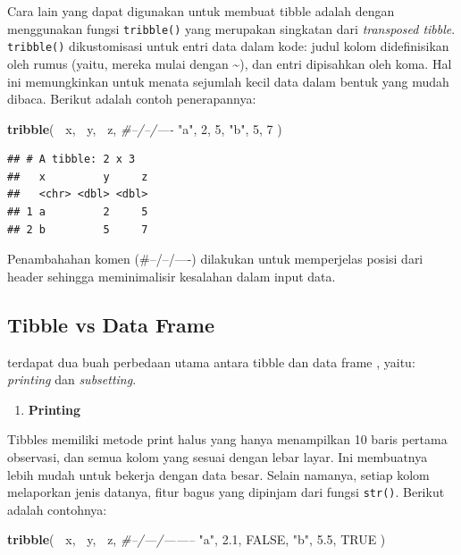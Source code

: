 \documentclass[]{book}
\newenvironment{Shaded}{\begin{snugshade}}{\end{snugshade}}
\newcommand{\KeywordTok}[1]{\textcolor[rgb]{0.13,0.29,0.53}{\textbf{#1}}}
\newcommand{\DecValTok}[1]{\textcolor[rgb]{0.00,0.00,0.81}{#1}}
\newcommand{\FloatTok}[1]{\textcolor[rgb]{0.00,0.00,0.81}{#1}}
\newcommand{\StringTok}[1]{\textcolor[rgb]{0.31,0.60,0.02}{#1}}
\newcommand{\CommentTok}[1]{\textcolor[rgb]{0.56,0.35,0.01}{\textit{#1}}}
\newcommand{\OtherTok}[1]{\textcolor[rgb]{0.56,0.35,0.01}{#1}}
\newcommand{\OperatorTok}[1]{\textcolor[rgb]{0.81,0.36,0.00}{\textbf{#1}}}
\newcommand{\NormalTok}[1]{#1}
\providecommand{\tightlist}{%
  \setlength{\itemsep}{0pt}\setlength{\parskip}{0pt}}
\begin{document}
Cara lain yang dapat digunakan untuk membuat tibble adalah dengan
menggunakan fungsi \texttt{tribble()} yang merupakan singkatan dari
\emph{transposed tibble}. \texttt{tribble()} dikustomisasi untuk entri
data dalam kode: judul kolom didefinisikan oleh rumus (yaitu, mereka
mulai dengan \textasciitilde{}), dan entri dipisahkan oleh koma. Hal ini
memungkinkan untuk menata sejumlah kecil data dalam bentuk yang mudah
dibaca. Berikut adalah contoh penerapannya:

\begin{Shaded}
\begin{Highlighting}[]
\KeywordTok{tribble}\NormalTok{(}
  \OperatorTok{~}\NormalTok{x, }\OperatorTok{~}\NormalTok{y, }\OperatorTok{~}\NormalTok{z,}
  \CommentTok{#--/--/----}
  \StringTok{"a"}\NormalTok{, }\DecValTok{2}\NormalTok{, }\DecValTok{5}\NormalTok{,}
  \StringTok{"b"}\NormalTok{, }\DecValTok{5}\NormalTok{, }\DecValTok{7}
\NormalTok{)}
\end{Highlighting}
\end{Shaded}

\begin{verbatim}
## # A tibble: 2 x 3
##   x         y     z
##   <chr> <dbl> <dbl>
## 1 a         2     5
## 2 b         5     7
\end{verbatim}

Penambahahan komen (\#--/--/----) dilakukan untuk memperjelas posisi
dari header sehingga meminimalisir kesalahan dalam input data.

\subsection{Tibble vs Data Frame}\label{tibble-vs-data-frame}

terdapat dua buah perbedaan utama antara tibble dan data frame , yaitu:
\emph{printing} dan \emph{subsetting}.

\begin{enumerate}
\def\labelenumi{\alph{enumi}.}
\tightlist
\item
  \textbf{Printing}
\end{enumerate}

Tibbles memiliki metode print halus yang hanya menampilkan 10 baris
pertama observasi, dan semua kolom yang sesuai dengan lebar layar. Ini
membuatnya lebih mudah untuk bekerja dengan data besar. Selain namanya,
setiap kolom melaporkan jenis datanya, fitur bagus yang dipinjam dari
fungsi \texttt{str()}. Berikut adalah contohnya:

\begin{Shaded}
\begin{Highlighting}[]
\KeywordTok{tribble}\NormalTok{(}
  \OperatorTok{~}\NormalTok{x, }\OperatorTok{~}\NormalTok{y, }\OperatorTok{~}\NormalTok{z,}
  \CommentTok{#--/---/--------}
  \StringTok{"a"}\NormalTok{, }\FloatTok{2.1}\NormalTok{, }\OtherTok{FALSE}\NormalTok{,}
  \StringTok{"b"}\NormalTok{, }\FloatTok{5.5}\NormalTok{, }\OtherTok{TRUE}
\NormalTok{)}
\end{Highlighting}
\end{Shaded}
\end{document}
